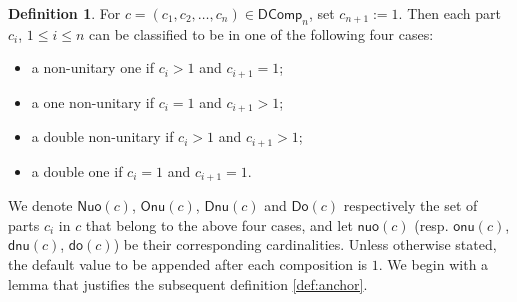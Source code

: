 \documentclass[reqno]{amsart}
\numberwithin{equation}{section}
\theoremstyle{definition}
\newtheorem{definition}{Definition}[section]
\theoremstyle{named}
\def\DComp{\mathsf{DComp}}
\def\Nuo{\mathsf{Nuo}}
\def\Onu{\mathsf{Onu}}
\def\Dnu{\mathsf{Dnu}}
\def\Do{\mathsf{Do}}
\def\nuo{\mathsf{nuo}}
\def\onu{\mathsf{onu}}
\def\dnu{\mathsf{dnu}}
\newcommand{\sdo}{\mathsf{do}}
\begin{document}
\begin{definition}
For $c=\left(c_1, c_2, \ldots, c_n\right) \in \DComp_n$, set $c_{n+1}:=1$. Then each part $c_i$, $1\le i\le n$ can be classified to be in one of the following four cases:
\begin{itemize}
	\item a non-unitary one if $c_i >1$ and $c_{i+1}=1$;
	\item a one non-unitary if $c_i =1$ and $c_{i+1}>1$;
	\item a double non-unitary if $c_i >1$ and $c_{i+1}>1$;
	\item a double one if $c_i =1$ and $c_{i+1}=1$.
\end{itemize}
\end{definition}
We denote $\Nuo(c)$, $\Onu(c)$, $\Dnu(c)$ and $\Do(c)$
respectively the set of parts $c_i$ in $c$ that belong to the above four cases, and let $\nuo(c)$ (resp. $\onu(c)$, $\dnu(c)$, $\sdo(c)$) be their corresponding cardinalities. Unless otherwise stated, the default value to be appended after each composition is $1$. We begin with a lemma that justifies the subsequent definition \ref{def:anchor}.
\end{document}
